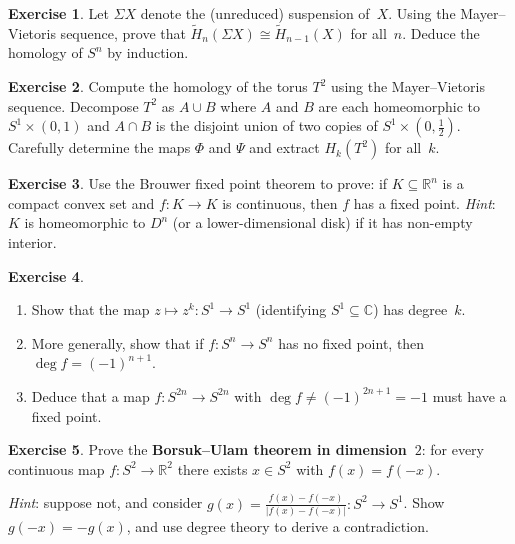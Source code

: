 \documentclass[12pt,a4paper,openany]{book}
\theoremstyle{definition}
\newtheorem{exercise}{Exercise}[chapter]
\theoremstyle{plain}
\theoremstyle{remark}
\newcommand{\R}{\mathbb{R}}
\newcommand{\C}{\mathbb{C}}
\newcommand{\abs}[1]{\left|#1\right|}
\begin{document}
\begin{exercise}\label{exo:suspension-iso}
Let $\Sigma X$ denote the (unreduced) suspension of~$X$.  Using the
Mayer--Vietoris sequence, prove that
$\widetilde{H}_n(\Sigma X)\cong\widetilde{H}_{n-1}(X)$
for all~$n$.  Deduce the homology of $S^n$ by induction.
\end{exercise}

\begin{exercise}\label{exo:mv-torus}
Compute the homology of the torus $T^2$ using the Mayer--Vietoris sequence.
Decompose $T^2$ as $A\cup B$ where $A$ and $B$ are each homeomorphic to
$S^1\times(0,1)$ and $A\cap B$ is the disjoint union of two copies
of $S^1\times(0,\tfrac{1}{2})$.  Carefully determine the maps $\Phi$ and $\Psi$
and extract $H_k(T^2)$ for all~$k$.
\end{exercise}

\begin{exercise}\label{exo:brouwer-generalized}
Use the Brouwer fixed point theorem to prove: if $K\subseteq\R^n$ is
a compact convex set and $f\colon K\to K$ is continuous, then $f$ has a
fixed point.
\textit{Hint}: $K$ is homeomorphic to $D^n$ (or a lower-dimensional disk)
if it has non-empty interior.
\end{exercise}

\begin{exercise}\label{exo:degree-computation}
\begin{enumerate}[label=\textup{(\alph*)},leftmargin=2em]
  \item Show that the map $z\mapsto z^k\colon S^1\to S^1$ (identifying
    $S^1\subseteq\C$) has degree~$k$.
  \item More generally, show that if $f\colon S^n\to S^n$ has no fixed point,
    then $\deg f=(-1)^{n+1}$.
  \item Deduce that a map $f\colon S^{2n}\to S^{2n}$ with
    $\deg f\ne(-1)^{2n+1}=-1$ must have a fixed point.
\end{enumerate}
\end{exercise}

\begin{exercise}\label{exo:borsuk-ulam-dim2}
Prove the \textbf{Borsuk--Ulam theorem in dimension~$2$}: for every
continuous map $f\colon S^2\to\R^2$ there exists $x\in S^2$ with $f(x)=f(-x)$.

\textit{Hint}: suppose not, and consider $g(x)=\frac{f(x)-f(-x)}{\abs{f(x)-f(-x)}}
\colon S^2\to S^1$.  Show $g(-x)=-g(x)$, and use degree theory
to derive a contradiction.
\end{exercise}
\end{document}
